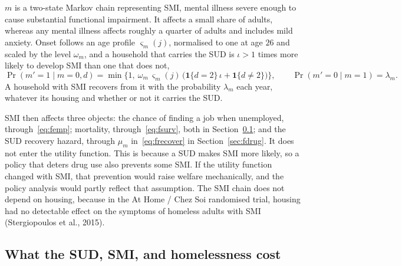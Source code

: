 \documentclass[10pt]{article}
\begin{document}
$m$ is a two-state Markov chain representing SMI, mental illness severe enough to cause substantial functional impairment. It affects a small share of adults, whereas any
mental illness affects roughly a quarter of adults and includes mild anxiety. Onset
follows an age profile $\varsigma_m(j)$, normalised to one at age $26$ and scaled by the level
$\omega_m$, and a household that carries the SUD is $\iota>1$ times more likely to develop SMI than one that does not,
\begin{equation}\label{eq:fonset}
\Pr(m'=1\mid m=0,d)=\min\big\{1,\ \omega_m\,\varsigma_m(j)\,\big(\mathbf{1}\{d=2\}\,\iota+\mathbf{1}\{d\neq2\}\big)\big\},
\qquad
\Pr(m'=0\mid m=1)=\lambda_m .
\end{equation}
A household with SMI recovers from it with the probability $\lambda_m$ each year, whatever its housing and whether or not it carries the SUD.

SMI then affects three objects: the chance of finding a job when unemployed, through~\eqref{eq:femp}; mortality, through~\eqref{eq:fsurv}, both in
Section~\ref{sec:fcosts}; and the SUD recovery hazard, through $\mu_m$
in~\eqref{eq:frecover} in Section~\ref{sec:fdrug}. It does not enter the utility function. This is because a SUD makes SMI more likely, so  a policy that deters drug use  also prevents some SMI. If the utility function changed with SMI, that prevention would raise welfare mechanically, and the policy analysis would partly reflect that assumption. The SMI chain does not
depend on housing, because in the At Home / Chez Soi randomised trial, housing had no detectable effect on the symptoms of homeless adults with SMI (Stergiopoulos et al., 2015).

\subsection{What the SUD, SMI, and homelessness cost}\label{sec:fcosts}
\end{document}
